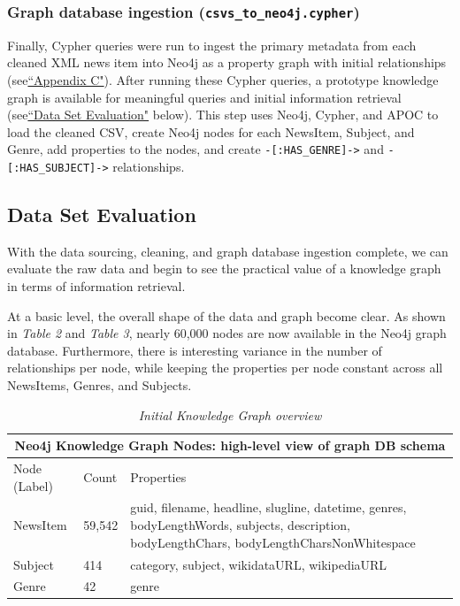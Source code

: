 \documentclass[11pt]{article}
\begin{document}
  \subsubsection{Graph database ingestion (\lstinline{csvs_to_neo4j.cypher})}
  Finally, Cypher queries were run to ingest the primary metadata from each cleaned XML news item into Neo4j as a property graph with initial relationships (see\hyperref[sec:AppendixC]{``Appendix C"}). After running these Cypher queries, a prototype knowledge graph is available for meaningful queries and initial information retrieval (see\hyperref[sec:DataSetEvaluation]{``Data Set Evaluation"} below). This step uses Neo4j, Cypher, and APOC to load the cleaned CSV, create Neo4j nodes for each NewsItem, Subject, and Genre, add properties to the nodes, and create \lstinline{-[:HAS_GENRE]->} and \lstinline{-[:HAS_SUBJECT]->} relationships.



\subsection{Data Set Evaluation}
\label{sec:DataSetEvaluation}

With the data sourcing, cleaning, and graph database ingestion complete, we can evaluate the raw data and begin to see the practical value of a knowledge graph in terms of information retrieval.

At a basic level, the overall shape of the data and graph become clear. As shown in \textit{Table 2} and \textit{Table 3}, nearly 60,000 nodes are now available in the Neo4j graph database. Furthermore, there is interesting variance in the number of relationships per node, while keeping the properties per node constant across all NewsItems, Genres, and Subjects.


\begin{table}
  \begin{tabular}{ |p{3cm}||p{2cm}|p{7cm}|  }
  \hline
  \multicolumn{3}{|c|}{Neo4j Knowledge Graph Nodes: high-level view of graph DB schema} \\
  \hline
  Node (Label)& Count &Properties\\
  \hline
  NewsItem&59,542&guid, filename, headline, slugline, datetime, genres, bodyLengthWords, subjects, description, bodyLengthChars, bodyLengthCharsNonWhitespace\\
  \hline
  Subject&414&category, subject, wikidataURL, wikipediaURL\\
  \hline
  Genre&42&genre\\
  \hline
  \end{tabular}
  \caption{\textit{Initial Knowledge Graph overview}}
\end{table}
\end{document}
